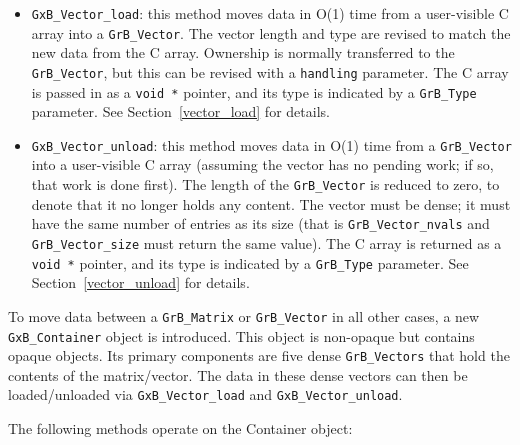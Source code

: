 \begin{itemize}

\item \verb'GxB_Vector_load':  this method moves data in O(1) time from a user-visible
    C array into a \verb'GrB_Vector'.  The vector length and type are revised
    to match the new data from the C array.  Ownership is normally transferred
    to the \verb'GrB_Vector', but this can be revised with a \verb'handling'
    parameter.  The C array is passed in as a \verb'void *' pointer, and its
    type is indicated by a \verb'GrB_Type' parameter.  See
    Section~\ref{vector_load} for details.

\item \verb'GxB_Vector_unload': this method moves data in O(1) time from a
    \verb'GrB_Vector' into a user-visible C array (assuming the vector has no
    pending work; if so, that work is done first).  The length of the
    \verb'GrB_Vector' is reduced to zero, to denote that it no longer holds any
    content.  The vector must be dense; it must have the same number of entries
    as its size (that is \verb'GrB_Vector_nvals' and \verb'GrB_Vector_size'
    must return the same value).  The C array is returned as a \verb'void *'
    pointer, and its type is indicated by a \verb'GrB_Type' parameter.  See
    Section~\ref{vector_unload} for details.

\end{itemize}

To move data between a \verb'GrB_Matrix' or \verb'GrB_Vector' in all other
cases, a new \verb'GxB_Container' object is introduced.  This object is
non-opaque but contains opaque objects.  Its primary components are five dense
\verb'GrB_Vectors' that hold the contents of the matrix/vector.  The data in
these dense vectors can then be loaded/unloaded via \verb'GxB_Vector_load' and
\verb'GxB_Vector_unload'.

The following methods operate on the Container object:

